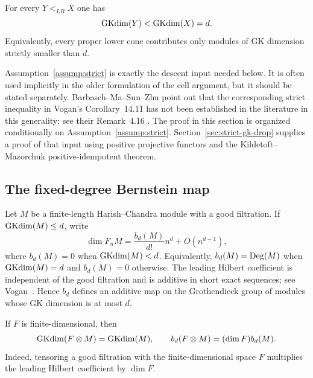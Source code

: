\begin{assump}\label{assump:strict}
For every $Y <_{LR} X$ one has
\[
  \operatorname{GKdim}(Y) < \operatorname{GKdim}(X) = d.
\]
Equivalently, every proper lower cone contributes only modules of GK
dimension strictly smaller than $d$.
\end{assump}

\begin{rk}
Assumption~\ref{assump:strict} is exactly the descent input needed below. It
is often used implicitly in the older formulation of the cell argument, but
it should be stated separately. Barbasch--Ma--Sun--Zhu point out that the
corresponding strict inequality in Vogan's Corollary~14.11 has not been
established in the literature in this generality; see their Remark~4.16
\cite{BMSZ22}. The proof in this section is organized conditionally on
Assumption~\ref{assump:strict}. Section~\ref{sec:strict-gk-drop} supplies a
proof of that input using positive projective functors and the
Kildetoft--Mazorchuk positive-idempotent theorem.
\end{rk}

\subsection{The fixed-degree Bernstein map}

Let $M$ be a finite-length Harish--Chandra module with a good filtration. If
$\operatorname{GKdim}(M) \leq d$, write
\[
  \dim F_nM = \frac{b_d(M)}{d!}n^d + O(n^{d-1}),
\]
where $b_d(M) = 0$ when $\operatorname{GKdim}(M) < d$. Equivalently, $b_d(M) = \operatorname{Deg}(M)$
when $\operatorname{GKdim}(M) = d$ and $b_d(M) = 0$ otherwise. The leading Hilbert
coefficient is independent of the good filtration and is additive in short
exact sequences; see Vogan~\cite{Vogan1978}. Hence $b_d$ defines an additive
map on the Grothendieck group of modules whose GK dimension is at most $d$.

If $F$ is finite-dimensional, then
\[
  \operatorname{GKdim}(F \otimes M) = \operatorname{GKdim}(M),
  \qquad
  b_d(F \otimes M) = (\dim F) b_d(M).
\]
Indeed, tensoring a good filtration with the finite-dimensional space $F$
multiplies the leading Hilbert coefficient by $\dim F$.

